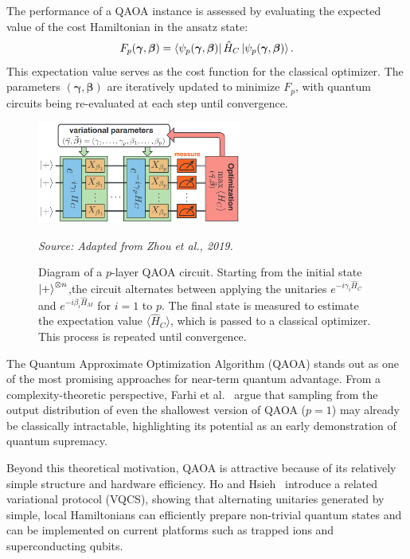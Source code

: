 The performance of a QAOA instance is assessed by evaluating the expected value of the cost Hamiltonian in the ansatz state:
\begin{equation}
    F_p (\bm{\gamma}, \bm{\beta}) = \bra{\psi_p (\bm{\gamma}, \bm{\beta})} \hat{H}_C \ket{\psi_p (\bm{\gamma}, \bm{\beta})}.
    \label{eq:cost_function}
\end{equation}
This expectation value serves as the cost function for the classical optimizer. The parameters $(\bm{\gamma}, \bm{\beta})$ are iteratively updated to minimize $F_p$, with quantum circuits being re-evaluated at each step until convergence.

\begin{figure}[h]
    \centering
    \includegraphics[width=0.6\textwidth]{01-introduction/figs/qaoa.png}
    \caption{Diagram of a $p$-layer QAOA circuit. Starting from the initial state $\ket{+}^{\otimes n}$,the circuit alternates between applying the unitaries $e^{-i \gamma_i \hat{H}_C}$ and $e^{-i \beta_i \hat{H}_M}$ for $i = 1$ to $p$. The final state is measured to estimate the expectation value $\langle \hat{H}_C \rangle$, which is passed to a classical optimizer. This process is repeated until convergence.}
    \vspace{0.3em}
    \small\textit{Source: Adapted from Zhou et al., 2019.~\cite{zhou_quantum_2020}}
    \label{fig:qaoa}
\end{figure}

The Quantum Approximate Optimization Algorithm (QAOA) stands out as one of the most promising approaches for near-term quantum advantage. From a complexity-theoretic perspective, Farhi et al.~\cite{farhi_quantum_2019} argue that sampling from the output distribution of even the shallowest version of QAOA ($p=1$) may already be classically intractable, highlighting its potential as an early demonstration of quantum supremacy.

Beyond this theoretical motivation, QAOA is attractive because of its relatively simple structure and hardware efficiency. Ho and Hsieh~\cite{ho_efficient_2019} introduce a related variational protocol (VQCS), showing that alternating unitaries generated by simple, local Hamiltonians can efficiently prepare non-trivial quantum states and can be implemented on current platforms such as trapped ions and superconducting qubits.

